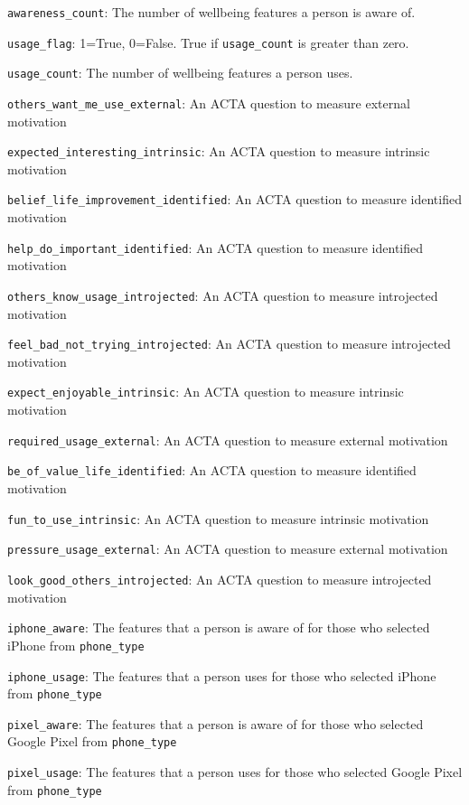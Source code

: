 \item \texttt{awareness\_count}: The number of wellbeing features a person is aware of.
\item \texttt{usage\_flag}: 1=True, 0=False. True if \texttt{usage\_count} is greater than zero.
\item \texttt{usage\_count}: The number of wellbeing features a person uses.
\item \texttt{others\_want\_me\_use\_external}: An ACTA question to measure external motivation
\item \texttt{expected\_interesting\_intrinsic}: An ACTA question to measure intrinsic motivation
\item \texttt{belief\_life\_improvement\_identified}: An ACTA question to measure identified motivation
\item \texttt{help\_do\_important\_identified}: An ACTA question to measure identified motivation
\item \texttt{others\_know\_usage\_introjected}: An ACTA question to measure introjected motivation
\item \texttt{feel\_bad\_not\_trying\_introjected}: An ACTA question to measure introjected motivation
\item \texttt{expect\_enjoyable\_intrinsic}: An ACTA question to measure intrinsic motivation
\item \texttt{required\_usage\_external}: An ACTA question to measure external motivation
\item \texttt{be\_of\_value\_life\_identified}: An ACTA question to measure identified motivation
\item \texttt{fun\_to\_use\_intrinsic}: An ACTA question to measure intrinsic motivation
\item \texttt{pressure\_usage\_external}: An ACTA question to measure external motivation
\item \texttt{look\_good\_others\_introjected}: An ACTA question to measure introjected motivation
\item \texttt{iphone\_aware}: The features that a person is aware of for those who selected iPhone from \texttt{phone\_type}
\item \texttt{iphone\_usage}: The features that a person uses for those who selected iPhone from \texttt{phone\_type}
\item \texttt{pixel\_aware}: The features that a person is aware of for those who selected Google Pixel from \texttt{phone\_type}
\item \texttt{pixel\_usage}: The features that a person uses for those who selected Google Pixel from \texttt{phone\_type}
